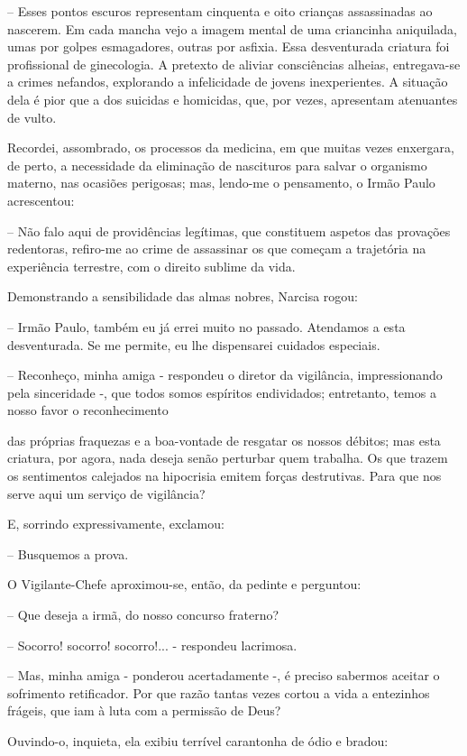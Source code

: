 \documentclass[portuguese,12pt,a4paper]{scrbook}
\begin{document}
	– Esses pontos escuros representam cinquenta e oito crianças assassinadas ao nascerem. Em cada mancha vejo a imagem mental de uma criancinha aniquilada, umas por golpes esmagadores, outras por asfixia. Essa desventurada criatura foi profissional de ginecologia. A pretexto de aliviar consciências alheias, entregava-se a crimes nefandos, explorando a infelicidade de jovens inexperientes. A situação dela é pior que a dos suicidas e homicidas, que, por vezes, apresentam atenuantes de vulto.
	
	Recordei, assombrado, os processos da medicina, em que muitas vezes enxergara, de perto, a necessidade da eliminação de nascituros para salvar o organismo materno, nas ocasiões perigosas; mas, lendo-me o pensamento, o Irmão Paulo acrescentou:
	
	– Não falo aqui de providências legítimas, que constituem aspetos das provações redentoras, refiro-me ao crime de assassinar os que começam a trajetória na experiência terrestre, com o direito sublime da vida.
	
	Demonstrando a sensibilidade das almas nobres, Narcisa rogou:
	
	– Irmão Paulo, também eu já errei muito no passado. Atendamos a esta desventurada. Se me permite, eu lhe dispensarei cuidados especiais.
	
	– Reconheço, minha amiga - respondeu o diretor da vigilância, impressionando pela sinceridade -, que todos somos espíritos endividados; entretanto, temos a nosso favor o reconhecimento
	
	
	das próprias fraquezas e a boa-vontade de resgatar os nossos débitos; mas esta criatura, por agora, nada deseja senão perturbar quem trabalha. Os que trazem os sentimentos calejados na hipocrisia emitem forças destrutivas. Para que nos serve aqui um serviço de vigilância?
	
	E, sorrindo expressivamente, exclamou:
	
	– Busquemos a prova.
	
	O Vigilante-Chefe aproximou-se, então, da pedinte e perguntou:
	
	– Que deseja a irmã, do nosso concurso fraterno?
	
	– Socorro! socorro! socorro!... - respondeu lacrimosa.
	
	– Mas, minha amiga - ponderou acertadamente -, é preciso sabermos aceitar o sofrimento retificador. Por que razão tantas vezes cortou a vida a entezinhos frágeis, que iam à luta com a permissão de Deus?
	
	Ouvindo-o, inquieta, ela exibiu terrível carantonha de ódio e bradou:
	
\end{document}
